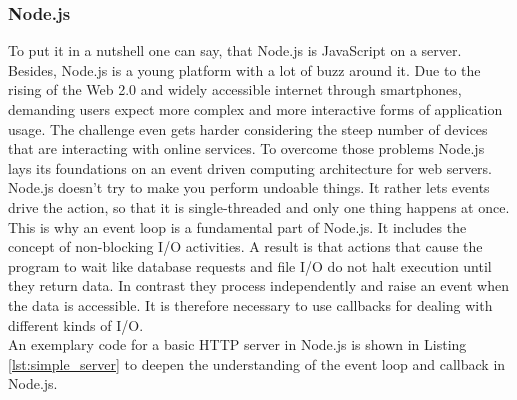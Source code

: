 \FloatBarrier

\subsubsection{Node.js}
\label{node.js}

To put it in a nutshell one can say, that Node.js is JavaScript on a server.\\
Besides, Node.js is a young platform with a lot of buzz around it. Due to the
rising of the Web 2.0 and widely accessible internet through smartphones,
demanding users expect more complex and more interactive forms of application usage. 
The challenge even gets harder considering the steep number of
devices that are interacting with online services.%
To overcome those problems Node.js lays its foundations on an event driven
computing architecture for web servers.\\
Node.js doesn't try to make you perform undoable things. It rather lets events drive the
action, so that it is single-threaded and only one thing happens at once. This
is why an event loop is a fundamental part of Node.js. It includes the concept
of non-blocking I/O activities. A result is that actions that cause the program
to wait like database requests and file I/O  do not halt execution until they
return data. In contrast they process independently and raise an event when the
data is accessible. It is therefore necessary to use callbacks for dealing with
different kinds of I/O.\\
An exemplary code for a basic HTTP server in Node.js is shown in Listing
\ref{lst:simple_server} to deepen the understanding of the event loop and
callback in Node.js.





